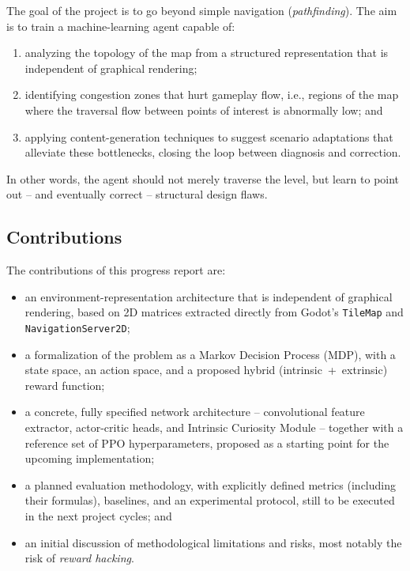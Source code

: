 \documentclass[sigconf,nonacm,language=english]{acmart}
\begin{document}
The goal of the project is to go beyond simple navigation
(\emph{pathfinding}). The aim is to train a machine-learning agent capable
of:
\begin{enumerate}
  \item analyzing the topology of the map from a structured representation
    that is independent of graphical rendering;
  \item identifying congestion zones that hurt gameplay flow, i.e., regions
    of the map where the traversal flow between points of interest is
    abnormally low; and
  \item applying content-generation techniques to suggest scenario
    adaptations that alleviate these bottlenecks, closing the loop between
    diagnosis and correction.
\end{enumerate}
In other words, the agent should not merely traverse the level, but learn
to point out -- and eventually correct -- structural design flaws.

\subsection{Contributions}

The contributions of this progress report are:
\begin{itemize}
  \item an environment-representation architecture that is independent of
    graphical rendering, based on 2D matrices extracted directly from
    Godot's \texttt{TileMap} and \texttt{NavigationServer2D};
  \item a formalization of the problem as a Markov Decision Process (MDP),
    with a state space, an action space, and a proposed hybrid
    (intrinsic~+~extrinsic) reward function;
  \item a concrete, fully specified network architecture -- convolutional
    feature extractor, actor-critic heads, and Intrinsic Curiosity Module
    -- together with a reference set of PPO hyperparameters, proposed as a
    starting point for the upcoming implementation;
  \item a planned evaluation methodology, with explicitly defined metrics
    (including their formulas), baselines, and an experimental protocol,
    still to be executed in the next project cycles; and
  \item an initial discussion of methodological limitations and risks,
    most notably the risk of \emph{reward hacking}.
\end{itemize}
\end{document}
